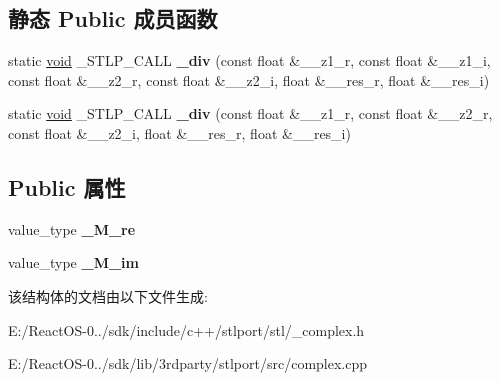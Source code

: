 \subsection*{静态 Public 成员函数}
\begin{DoxyCompactItemize}
\item 
\mbox{\label{structcomplex_3_01float_01_4_a111ba54c8943db16356768e6710ea840}} 
static \hyperlink{interfacevoid}{void} \+\_\+\+S\+T\+L\+P\+\_\+\+C\+A\+LL {\bfseries \+\_\+div} (const float \&\+\_\+\+\_\+z1\+\_\+r, const float \&\+\_\+\+\_\+z1\+\_\+i, const float \&\+\_\+\+\_\+z2\+\_\+r, const float \&\+\_\+\+\_\+z2\+\_\+i, float \&\+\_\+\+\_\+res\+\_\+r, float \&\+\_\+\+\_\+res\+\_\+i)
\item 
\mbox{\label{structcomplex_3_01float_01_4_a1d29e0dfa284303279a93fc810953c39}} 
static \hyperlink{interfacevoid}{void} \+\_\+\+S\+T\+L\+P\+\_\+\+C\+A\+LL {\bfseries \+\_\+div} (const float \&\+\_\+\+\_\+z1\+\_\+r, const float \&\+\_\+\+\_\+z2\+\_\+r, const float \&\+\_\+\+\_\+z2\+\_\+i, float \&\+\_\+\+\_\+res\+\_\+r, float \&\+\_\+\+\_\+res\+\_\+i)
\end{DoxyCompactItemize}
\subsection*{Public 属性}
\begin{DoxyCompactItemize}
\item 
\mbox{\label{structcomplex_3_01float_01_4_afaed7de03988f95e50fb1f5a99814960}} 
value\+\_\+type {\bfseries \+\_\+\+M\+\_\+re}
\item 
\mbox{\label{structcomplex_3_01float_01_4_acb21825d6c36a998c2ca78f6709b380b}} 
value\+\_\+type {\bfseries \+\_\+\+M\+\_\+im}
\end{DoxyCompactItemize}


该结构体的文档由以下文件生成\+:\begin{DoxyCompactItemize}
\item 
E\+:/\+React\+O\+S-\/0../sdk/include/c++/stlport/stl/\+\_\+complex.\+h\item 
E\+:/\+React\+O\+S-\/0../sdk/lib/3rdparty/stlport/src/complex.\+cpp\end{DoxyCompactItemize}
